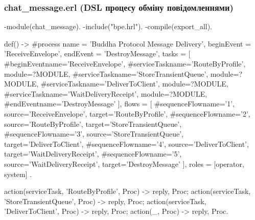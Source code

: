 \documentclass{article}
\let\originalfootnotesize\footnotesize
\let\oldverbatim\verbatim
\let\oldendverbatim\endverbatim
\renewenvironment{verbatim}{\originalfootnotesize\oldverbatim}{\oldendverbatim}
\begin{document}
\subsubsection{chat\_message.erl (DSL процесу обміну повідомленнями)}
\begin{verbatim}
-module(chat_message).
-include("bpe.hrl").
-compile(export_all).

def() ->
    #process{
        name = 'Buddha Protocol Message Delivery',
        beginEvent = 'ReceiveEnvelope',
        endEvent = 'DestroyMessage',
        tasks = [
            #beginEvent{name='ReceiveEnvelope'},
            #serviceTask{name='RouteByProfile', module=?MODULE},
            #serviceTask{name='StoreTransientQueue', module=?MODULE},
            #serviceTask{name='DeliverToClient', module=?MODULE},
            #serviceTask{name='WaitDeliveryReceipt', module=?MODULE},
            #endEvent{name='DestroyMessage'}
        ],
        flows = [
            #sequenceFlow{name='1', source='ReceiveEnvelope', target='RouteByProfile'},
            #sequenceFlow{name='2', source='RouteByProfile', target='StoreTransientQueue'},
            #sequenceFlow{name='3', source='StoreTransientQueue', target='DeliverToClient'},
            #sequenceFlow{name='4', source='DeliverToClient', target='WaitDeliveryReceipt'},
            #sequenceFlow{name='5', source='WaitDeliveryReceipt', target='DestroyMessage'}
        ],
        roles = [operator, system]
    }.

action({serviceTask, 'RouteByProfile'}, Proc) ->
    % Визначення одержувача та активної сесії
    {reply, Proc};
action({serviceTask, 'StoreTransientQueue'}, Proc) ->
    % Запис у транзієнтну Mnesia таблицю
    {reply, Proc};
action({serviceTask, 'DeliverToClient'}, Proc) ->
    % Відправка через TCP сокет
    {reply, Proc};
action(_, Proc) -> {reply, Proc}.
\end{verbatim}
\end{document}
